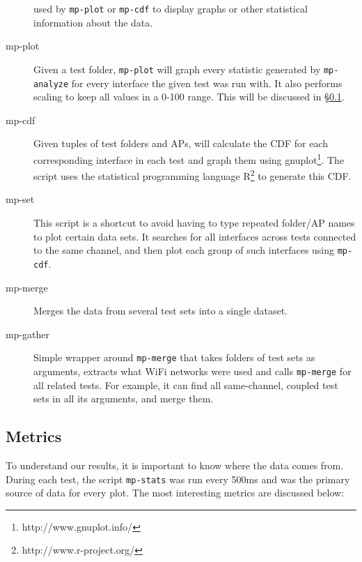 \begin{description}
    used by \texttt{mp-plot} or \texttt{mp-cdf} to display graphs or other
    statistical information about the data.
  \item[mp-plot]
    Given a test folder, \texttt{mp-plot} will graph every statistic generated
    by \texttt{mp-analyze} for every interface the given test was run with. It
    also performs scaling to keep all values in a 0-100 range. This will be
    discussed in \S\ref{sec:met:metrics}.
  \item[mp-cdf]
    Given tuples of test folders and APs, will calculate the CDF for each
    corresponding interface in each test and graph them using
    gnuplot\footnote{http://www.gnuplot.info/}. The script uses the statistical
    programming language R\footnote{http://www.r-project.org/} to generate this
    CDF.
  \item[mp-set]
    This script is a shortcut to avoid having to type repeated folder/AP names
    to plot certain data sets. It searches for all interfaces across tests
    connected to the same channel, and then plot each group of such interfaces
    using \texttt{mp-cdf}.
  \item[mp-merge]
    Merges the data from several test sets into a single dataset.
  \item[mp-gather]
    Simple wrapper around \texttt{mp-merge} that takes folders of test sets as
    arguments, extracts what WiFi networks were used and calls \texttt{mp-merge}
    for all related tests. For example, it can find all same-channel, coupled
    test sets in all its arguments, and merge them.
\end{description}

\subsection{Metrics}
\label{sec:met:metrics}
To understand our results, it is important to know where the data comes from.
During each test, the script \texttt{mp-stats} was run every 500ms and was the
primary source of data for every plot. The most interesting metrics are
discussed below:

